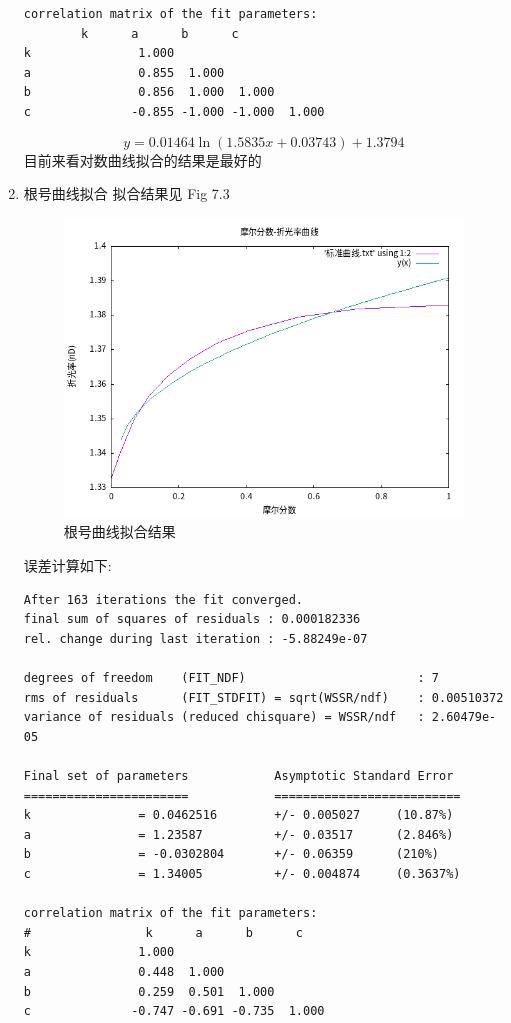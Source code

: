 \documentclass[11pt]{report}
\begin{document}
\begin{enumerate}
\begin{verbatim}
correlation matrix of the fit parameters:
		k      a      b      c      
k               1.000 
a               0.855  1.000 
b               0.856  1.000  1.000 
c              -0.855 -1.000 -1.000  1.000 
\end{verbatim}
\[
     y=0.01464\ln(1.5835x+0.03743)+1.3794
     \]
目前来看对数曲线拟合的结果是最好的
\item 根号曲线拟合
\label{sec:orge2f1991}
拟合结果见 Fig 7.3
\begin{figure}[htbp]
\centering
\includegraphics[width=.9\linewidth]{../data/标准曲线-根号曲线拟合.png}
\caption{\label{fig:orge54bb98}根号曲线拟合结果}
\end{figure}
误差计算如下:
\begin{verbatim}
After 163 iterations the fit converged.
final sum of squares of residuals : 0.000182336
rel. change during last iteration : -5.88249e-07

degrees of freedom    (FIT_NDF)                        : 7
rms of residuals      (FIT_STDFIT) = sqrt(WSSR/ndf)    : 0.00510372
variance of residuals (reduced chisquare) = WSSR/ndf   : 2.60479e-05

Final set of parameters            Asymptotic Standard Error
=======================            ==========================
k               = 0.0462516        +/- 0.005027     (10.87%)
a               = 1.23587          +/- 0.03517      (2.846%)
b               = -0.0302804       +/- 0.06359      (210%)
c               = 1.34005          +/- 0.004874     (0.3637%)

correlation matrix of the fit parameters:
#                k      a      b      c      
k               1.000 
a               0.448  1.000 
b               0.259  0.501  1.000 
c              -0.747 -0.691 -0.735  1.000 


\end{verbatim}
\end{enumerate}
\end{document}
